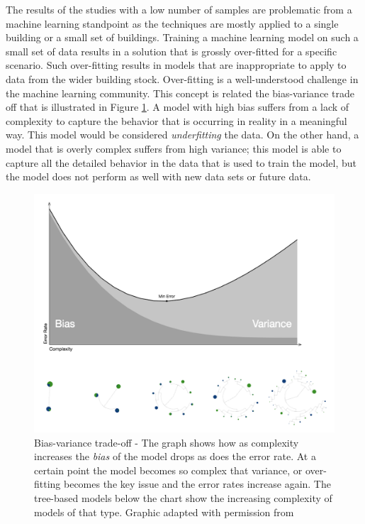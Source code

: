 \documentclass[preprint,12pt]{elsarticle}
\begin{document}
The results of the studies with a low number of samples are problematic from a machine learning standpoint as the techniques are mostly applied to a single building or a small set of buildings. Training a machine learning model on such a small set of data results in a solution that is grossly over-fitted for a specific scenario. Such over-fitting results in models that are inappropriate to apply to data from the wider building stock. Over-fitting is a well-understood challenge in the machine learning community. This concept is related the bias-variance trade off that is illustrated in Figure \ref{fig:bias-variance}. A model with high bias suffers from a lack of complexity to capture the behavior that is occurring in reality in a meaningful way. This model would be considered \emph{underfitting} the data. On the other hand, a model that is overly complex suffers from high variance; this model is able to capture all the detailed behavior in the data that is used to train the model, but the model does not perform as well with new data sets or future data.

\begin{figure}[ht!]
\begin{center}
\includegraphics[width=1\columnwidth]{figures/bias-variance-tradeoff.png}
\caption{Bias-variance trade-off - The graph shows how as complexity increases the \emph{bias} of the model drops as does the error rate. At a certain point the model becomes so complex that variance, or over-fitting becomes the key issue and the error rates increase again. The tree-based models below the chart show the increasing complexity of models of that type. Graphic adapted with permission from \cite{YeeStephanieModelTradeoff}}
\label{fig:bias-variance}%
\end{center}
\end{figure}
\end{document}
